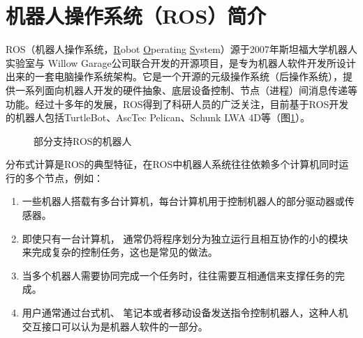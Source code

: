 \section{机器人操作系统（ROS）简介}
ROS（机器人操作系统，\underline{R}obot \underline{O}perating \underline{S}ystem）源于2007年斯坦福大学机器人实验室与  Willow Garage公司联合开发的开源项目，是专为机器人软件开发所设计出来的一套电脑操作系统架构。它是一个开源的元级操作系统（后操作系统），提供一系列面向机器人开发的硬件抽象、底层设备控制、节点（进程）间消息传递等功能\cite{fairchildROSRoboticsExample2016}。经过十多年的发展，ROS得到了科研人员的广泛关注，目前基于ROS开发的机器人包括TurtleBot、AscTec Pelican、Schunk LWA 4D等（图\ref{figure_ros_support}）。
\begin{figure}[htbp]
  \centering
  \hspace{10pt}
  \hspace{10pt}
  \caption{部分支持ROS的机器人}\label{figure_ros_support} %
\end{figure}

分布式计算是ROS的典型特征，在ROS中机器人系统往往依赖多个计算机同时运行的多个节点，例如\cite{okaneGentleIntroductionROS2014}：
\begin{enumerate}[leftmargin=0em, listparindent=2em, parsep=0em, topsep=0em, label=（\theenumi）]
\setlength{\itemindent}{4em}
\setlength{\labelsep}{0em}
\setlength{\labelwidth}{2em}
\setlength{\parsep}{0em}
\setlength{\itemsep}{0em}
\setlength{\topsep}{0em}
  \item 一些机器人搭载有多台计算机，每台计算机用于控制机器人的部分驱动器或传感器。
  \item 即使只有一台计算机， 通常仍将程序划分为独立运行且相互协作的小的模块来完成复杂的控制任务，这也是常见的做法。
  \item 当多个机器人需要协同完成一个任务时，往往需要互相通信来支撑任务的完成。
  \item 用户通常通过台式机、 笔记本或者移动设备发送指令控制机器人，这种人机交互接口可以认为是机器人软件的一部分。
\end{enumerate}

